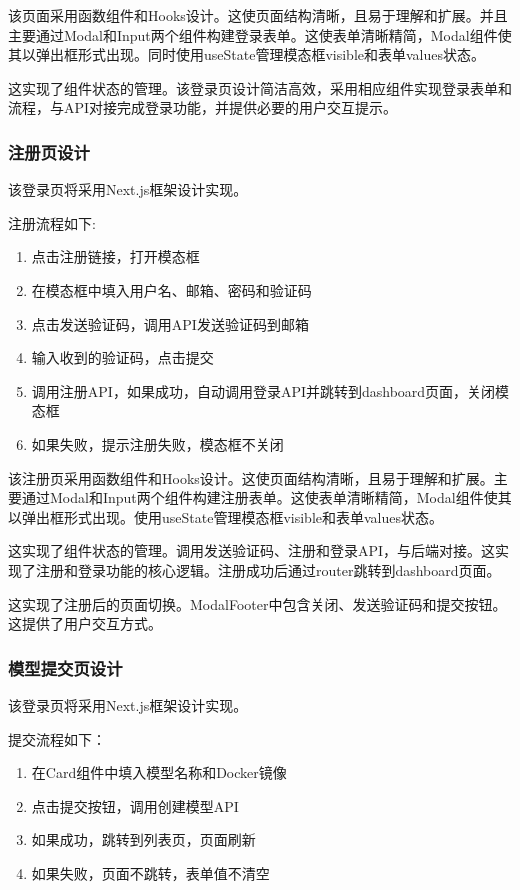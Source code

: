 \documentclass{HDU-Bachelor-Thesis}
\begin{document}
该页面采用函数组件和Hooks设计。这使页面结构清晰，且易于理解和扩展。并且主要通过Modal和Input两个组件构建登录表单。这使表单清晰精简，Modal组件使其以弹出框形式出现。同时使用useState管理模态框visible和表单values状态。

这实现了组件状态的管理。该登录页设计简洁高效，采用相应组件实现登录表单和流程，与API对接完成登录功能，并提供必要的用户交互提示。

\subsubsection{注册页设计}

该登录页将采用Next.js框架设计实现。

注册流程如下:

\begin{enumerate}
\item 点击注册链接，打开模态框
\item 在模态框中填入用户名、邮箱、密码和验证码
\item 点击发送验证码，调用API发送验证码到邮箱
\item 输入收到的验证码，点击提交
\item 调用注册API，如果成功，自动调用登录API并跳转到dashboard页面，关闭模态框
\item 如果失败，提示注册失败，模态框不关闭
\end{enumerate}

该注册页采用函数组件和Hooks设计。这使页面结构清晰，且易于理解和扩展。主要通过Modal和Input两个组件构建注册表单。这使表单清晰精简，Modal组件使其以弹出框形式出现。使用useState管理模态框visible和表单values状态。

这实现了组件状态的管理。调用发送验证码、注册和登录API，与后端对接。这实现了注册和登录功能的核心逻辑。注册成功后通过router跳转到dashboard页面。

这实现了注册后的页面切换。ModalFooter中包含关闭、发送验证码和提交按钮。这提供了用户交互方式。

\subsubsection{模型提交页设计}

该登录页将采用Next.js框架设计实现。

提交流程如下：

\begin{enumerate}
\item 在Card组件中填入模型名称和Docker镜像
\item 点击提交按钮，调用创建模型API
\item 如果成功，跳转到列表页，页面刷新
\item 如果失败，页面不跳转，表单值不清空
\end{enumerate}
\end{document}
